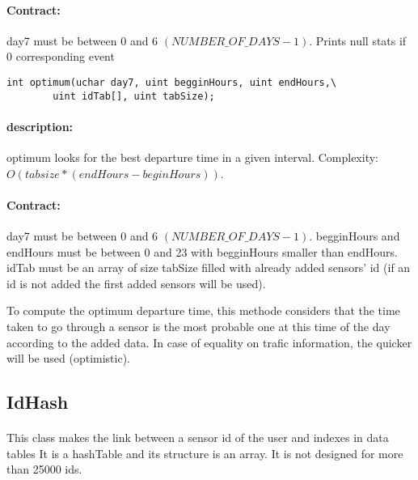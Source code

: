 \documentclass[a4paper, 12pts]{article}
\begin{document}
\paragraph{Contract:}
	day7 must be between 0 and 6 $(NUMBER\_OF\_DAYS-1)$. Prints null stats if 0 corresponding event
		
\begin{lstlisting}
int optimum(uchar day7, uint begginHours, uint endHours,\
		uint idTab[], uint tabSize);
\end{lstlisting}
\paragraph{description:}
	optimum looks for the best departure time in a given interval. Complexity: $O(tabsize * (endHours-beginHours) )$.
\paragraph{Contract:}
	day7 must be between 0 and 6 $(NUMBER\_OF\_DAYS-1)$. begginHours and endHours must be between 0 and 23 with begginHours smaller than endHours. idTab must be an array of size tabSize filled with already added sensors' id (if an id is not added the first added sensors will be used).
	
	To compute the optimum departure time, this methode considers that the time taken to go through a sensor is the most probable one at this time of the day according to the added data. In case of equality on trafic information, the quicker will be used (optimistic).

\subsection{IdHash}

\paragraph{}
This class makes the link between a sensor id of the user and indexes in data tables
It is a hashTable and its structure is an array.
It is not designed for more than 25000 ids.

\end{document}
